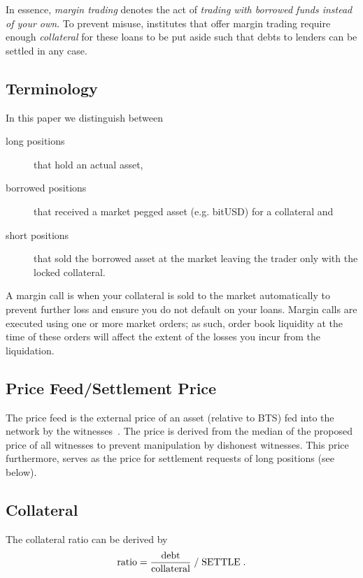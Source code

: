 In essence, \emph{margin trading} denotes the act of \emph{trading with
borrowed funds instead of your own}. To prevent misuse, institutes that offer
margin trading require enough \emph{collateral} for these loans to be put aside 
such that debts to lenders can be settled in any case.

\subsection{Terminology}

In this paper we distinguish between 
\begin{description}
 \item[long positions] that hold an actual asset,
 \item[borrowed positions] that received a market pegged asset (e.g. bitUSD)
                           for a collateral and
 \item[short positions] that sold the borrowed asset at the market leaving the
                        trader only with the locked collateral. 
\end{description}

A margin call is when your collateral is sold to the market automatically to
prevent further loss and ensure you do not default on your loans. Margin calls
are executed using one or more market orders; as such, order book liquidity at
the time of these orders will affect the extent of the losses you incur from
the liquidation. 

\subsection{Price Feed/Settlement Price}

The price feed is the external price of an asset (relative to BTS) fed into the
network by the witnesses~\cite{bts:financial}. The price is derived from the
median of the proposed price of all witnesses to prevent manipulation by
dishonest witnesses. This price furthermore, serves as the price for
settlement requests of long positions (see below).

\subsection{Collateral}

The collateral ratio can be derived by
\begin{align*}
 \text{ratio} = \frac{\text{debt}}{\text{collateral}} \;/\; \text{SETTLE}\;.
\end{align*}

